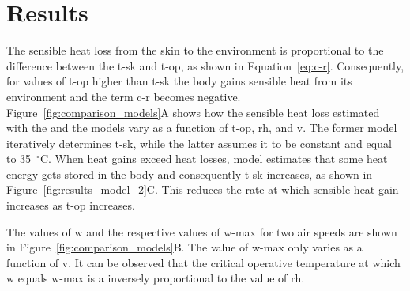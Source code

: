 

\section{Results}\label{sec:results}

The sensible heat loss from the skin to the environment is proportional to the difference between the \ac{t-sk} and \ac{t-op}, as shown in Equation~\ref{eq:c-r}.
Consequently, for values of \ac{t-op} higher than \ac{t-sk} the body gains sensible heat from its environment and the term \ac{c-r} becomes negative.
Figure~\ref{fig:comparison_models}A shows how the sensible heat loss estimated with the  and the  models vary as a function of \ac{t-op}, \ac{rh}, and \ac{v}.
The former model iteratively determines \ac{t-sk}, while the latter assumes it to be constant and equal to 35~$^{\circ}$C\@.
When heat gains exceed heat losses,  model estimates that some heat energy gets stored in the body and consequently \ac{t-sk} increases, as shown in Figure~\ref{fig:results_model_2}C\@.
This reduces the rate at which sensible heat gain increases as \ac{t-op} increases.

The values of \ac{w} and the respective values of \ac{w-max} for two air speeds are shown in Figure~\ref{fig:comparison_models}B\@.
The value of \ac{w-max} only varies as a function of \ac{v}.
It can be observed that the critical operative temperature at which \ac{w} equals \ac{w-max} is a inversely proportional to the value of \ac{rh}.

